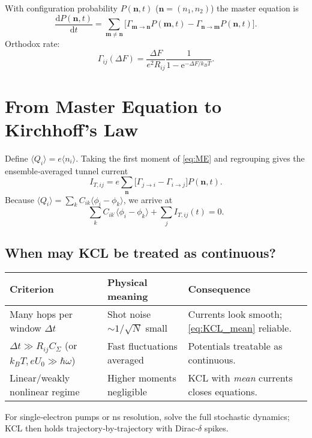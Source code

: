 \documentclass[11pt]{article}
\newcommand{\vect}[1]{\bm{#1}}
\newcommand{\dd}{\mathrm{d}}
\newcommand{\e}{\mathrm{e}}
\begin{document}
With configuration probability $P(\vect n,t)$ (\(\vect n=(n_1,n_2)\)) the master equation is
\begin{equation}
    \frac{\dd P(\vect n,t)}{\dd t}=\sum_{\vect m\neq\vect n}\bigl[\Gamma_{\vect m\to\vect n}P(\vect m,t)-\Gamma_{\vect n\to\vect m}P(\vect n,t)\bigr].
    \label{eq:ME}
\end{equation}
Orthodox rate:
\begin{equation}
    \boxed{\Gamma_{ij}(\Delta F)=\frac{\Delta F}{e^2R_{ij}}\frac{1}{1-\e^{-\Delta F/k_BT}}.}
    \label{eq:gamma}
\end{equation}

\section{From Master Equation to Kirchhoff’s Law}
\label{sec:ME_to_KCL}

Define $\langle Q_i\rangle=e\langle n_i\rangle$. Taking the first moment of \eqref{eq:ME} and regrouping gives the ensemble‑averaged tunnel current
\begin{equation}
    I_{T,ij}=e\sum_{\vect n}\bigl[\Gamma_{j\to i}-\Gamma_{i\to j}\bigr]P(\vect n,t).
\end{equation}
Because $\langle Q_i\rangle=\sum_k C_{ik}\langle\phi_i-\phi_k\rangle$, we arrive at
\begin{equation}
 \boxed{\sum_k C_{ik}\,\dot{\!}\langle\phi_i-\phi_k\rangle+\sum_j I_{T,ij}(t)=0.}
 \label{eq:KCL_mean}
\end{equation}
\subsection*{When may KCL be treated as continuous?}
\begin{center}
\begin{tabular}{@{}p{}p{}p{}@{}}
\toprule
Criterion & Physical meaning & Consequence \\
\midrule
Many hops per window $\Delta t$ & Shot noise $\sim1/\sqrt N$ small & Currents look smooth; \eqref{eq:KCL_mean} reliable. \\
$\Delta t\gg R_{ij}C_\Sigma$ (or $k_BT,eU_0\gg\hbar\omega$) & Fast fluctuations averaged & Potentials treatable as continuous. \\
Linear/weakly nonlinear regime & Higher moments negligible & KCL with \emph{mean} currents closes equations. \\
\bottomrule
\end{tabular}
\end{center}
For single‑electron pumps or ns resolution, solve the full stochastic dynamics; KCL then holds trajectory‑by‑trajectory with Dirac‑$\delta$ spikes.
\end{document}

